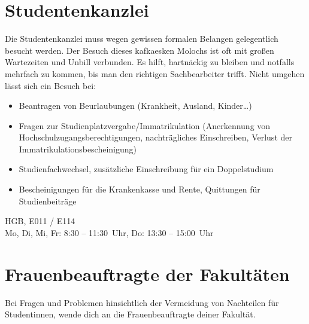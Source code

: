 \begin{urlList}
\end{urlList}

\section{Studentenkanzlei}

Die Studentenkanzlei muss wegen gewissen formalen Belangen
gelegentlich besucht werden. Der Besuch dieses kafkaesken Molochs ist
oft mit großen Wartezeiten und Unbill verbunden. Es hilft, hartnäckig
zu bleiben und notfalls mehrfach zu kommen, bis man den richtigen
Sachbearbeiter trifft. Nicht umgehen lässt sich ein Besuch bei:

\begin{itemize}
\item Beantragen von Beurlaubungen (Krankheit, Ausland, Kinder\ldots)
\item Fragen zur Studienplatzvergabe/Immatrikulation (Anerkennung von Hochschulzugangsberechtigungen, nachträgliches Einschreiben, Verlust der Immatrikulationsbescheinigung)
\item Studienfachwechsel, zusätzliche Einschreibung für ein Doppelstudium
\item Bescheinigungen für die Krankenkasse und Rente, Quittungen für Studienbeiträge
\end{itemize}

HGB, E011 / E114\\
Mo, Di, Mi, Fr: 8:30 -- 11:30~Uhr, Do: 13:30 -- 15:00~Uhr

\begin{urlList}
\end{urlList}

%

\section{Frauenbeauftragte der Fakultäten}
Bei Fragen und Problemen hinsichtlich der Vermeidung von Nachteilen für Studentinnen,
wende dich an die Frauenbeauftragte deiner Fakultät.



